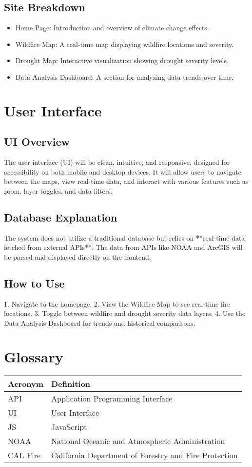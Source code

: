\documentclass[12pt]{article}
\begin{document}
\subsection{Site Breakdown}
\begin{itemize}
  \item Home Page: Introduction and overview of climate change effects.
  \item Wildfire Map: A real-time map displaying wildfire locations and severity.
  \item Drought Map: Interactive visualization showing drought severity levels.
  \item Data Analysis Dashboard: A section for analyzing data trends over time.
\end{itemize}

\newpage
\section{User Interface}
\subsection{UI Overview}
The user interface (UI) will be clean, intuitive, and responsive, designed for accessibility on both mobile and desktop devices. It will allow users to navigate between the maps, view real-time data, and interact with various features such as zoom, layer toggles, and data filters.

\subsection{Database Explanation}
The system does not utilize a traditional database but relies on **real-time data fetched from external APIs**. The data from APIs like NOAA and ArcGIS will be parsed and displayed directly on the frontend.

\subsection{How to Use}
1. Navigate to the homepage.
2. View the Wildfire Map to see real-time fire locations.
3. Toggle between wildfire and drought severity data layers.
4. Use the Data Analysis Dashboard for trends and historical comparisons.

\newpage
\section*{Glossary}
\begin{longtable}{|p{1.5in}|p{4in}|}
\hline
\textbf{Acronym} & \textbf{Definition} \\
\hline
API & Application Programming Interface \\
\hline
UI & User Interface \\
\hline
JS & JavaScript \\
\hline
NOAA & National Oceanic and Atmospheric Administration \\
\hline
CAL Fire & California Department of Forestry and Fire Protection \\
\hline
\end{longtable}
\end{document}
